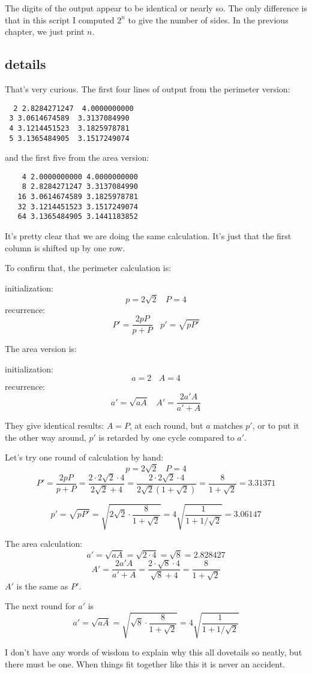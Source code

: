 \documentclass[11pt, oneside]{article}
\begin{document}
The digits of the output appear to be identical or nearly so.  The only difference is that in this script I computed $2^n$ to give the number of sides.  In the previous chapter, we just print $n$.

\subsection*{details}

That's very curious.  The first four lines of output from the perimeter version:

\begin{verbatim}
  2 2.8284271247  4.0000000000
 3 3.0614674589  3.3137084990
 4 3.1214451523  3.1825978781
 5 3.1365484905  3.1517249074
\end{verbatim}

and the first five from the area version:
\begin{verbatim}
    4 2.0000000000 4.0000000000
    8 2.8284271247 3.3137084990
   16 3.0614674589 3.1825978781
   32 3.1214451523 3.1517249074
   64 3.1365484905 3.1441183852
\end{verbatim}

It's pretty clear that we are doing the same calculation.  It's just that the first column is shifted up by one row.

To confirm that, the perimeter calculation is:

initialization:
\[ p = 2 \sqrt{2} \ \ \ \ P = 4 \]
recurrence:
\[ P' = \frac{2pP}{p + P} \ \ \ \ p' = \sqrt{pP'} \]

The area version is:

initialization:
\[ a = 2 \ \ \ \ A = 4 \]
recurrence:
\[ a' =  \sqrt{aA} \ \ \ \  A' = \frac{2a'A}{a' + A} \]

They give identical results:  $A = P$, at each round, but $a$ matches $p'$, or to put it the other way around, $p'$ is retarded by one cycle compared to $a'$.

Let's try one round of calculation by hand:
\[ p = 2 \sqrt{2} \ \ \ \ P = 4 \]
\[  P' = \frac{2pP}{p + P} = \frac{2 \cdot 2 \sqrt{2} \cdot 4}{ 2 \sqrt{2} + 4} = \frac{2 \cdot 2 \sqrt{2} \cdot 4}{ 2 \sqrt{2}(1 + \sqrt{2})} = \frac{8}{1 + \sqrt{2}} = 3.31371  \]

\[ p' = \sqrt{pP'} = \sqrt{2 \sqrt{2} \cdot \frac{8}{1 + \sqrt{2}}} = 4 \sqrt{\frac{1}{1 +1/ \sqrt{2}} } = 3.06147 \]

The area calculation:
\[ a' =  \sqrt{aA} = \sqrt{2 \cdot 4} = \sqrt{8} = 2.828427 \]
\[ A' = \frac{2a'A}{a' + A} =  \frac{2 \cdot \sqrt{8}\cdot 4}{\sqrt{8} + 4} =  \frac{8}{1 + \sqrt{2}} \]
$A'$ is the same as $P'$.

The next round for $a'$ is
\[ a' =  \sqrt{aA} = \sqrt{ \sqrt{8} \cdot  \frac{8}{1 + \sqrt{2}}} = 4 \sqrt{ \frac{1}{1 + 1/ \sqrt{2}}} \]

I don't have any words of wisdom to explain why this all dovetails so neatly, but there must be one.  When things fit together like this it is never an accident.
\end{document}
